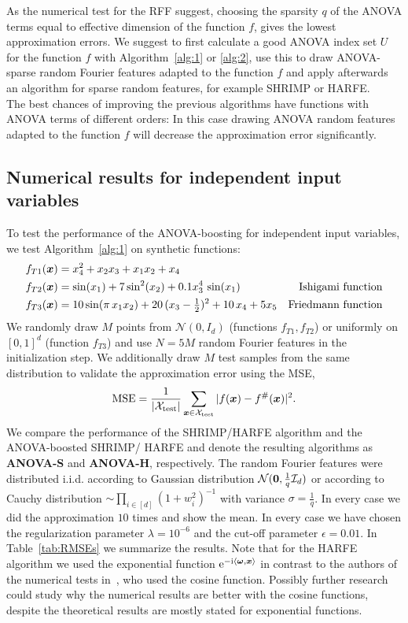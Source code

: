 \documentclass{article}
\renewcommand{\vec}[1]{\ensuremath \mathbf{\boldsymbol{#1}}}
\newcommand{\X}{\ensuremath{\mathcal{X}}}
\newcommand{\w}{\ensuremath{\vec \omega}}
\newcommand{\G}{\ensuremath{\mathcal{N}}} %
\newcommand{\x}{\ensuremath{\vec x}}
\newcommand{\I}{\ensuremath{\mathcal{I}}}
\newcommand{\e}{\mathrm{e}}
\newcommand{\im}{\mathrm{i}}
\theoremstyle{definition}
\numberwithin{equation}{section}
\begin{document}
As the numerical test for the RFF suggest, choosing the sparsity $q$ of the ANOVA terms equal to effective dimension of the function $f$, gives the lowest approximation errors. We suggest to first calculate a good ANOVA index set $U$ for the function $f$ with Algorithm~\ref{alg:1} or \ref{alg:2}, use this to draw ANOVA-sparse random Fourier features adapted to the function $f$ and apply afterwards an algorithm for sparse random features, for example SHRIMP or HARFE.\\
The best chances of 
improving the previous algorithms have functions with ANOVA terms of different orders: In this case drawing 
ANOVA random features adapted to the function $f$ will decrease the approximation error significantly. 

\subsection{Numerical results for independent input variables}
To test the performance of the ANOVA-boosting for independent input variables, we test Algorithm~\ref{alg:1} on synthetic functions:
\begin{align}\label{eq:fT1}
f_{T1}(\vec x) &= x_4^2 +x_2x_3 +x_1x_2 +x_4&\\
f_{T2}(\vec x) &= \sin(x_1) + 7 \sin^2(x_2) +0.1 x_3^4\, \sin(x_1) & \text{Ishigami function}\label{eq:fT2}\\
f_{T3}(\x) &= 10 \sin(\pi \, x_1 x_2) + 20 \, (x_3- \tfrac 12)^2 + 10 \, x_4 + 5 x_5&\text{Friedmann function}\label{eq:fT3}
\end{align}
We randomly draw $M$ points from $\G(0,I_d)$ (functions $f_{T1},f_{T2}$) or uniformly on $[0,1]^d$ (function $f_{T3}$) and 
use $N=5M$ random Fourier features in the initialization step. We additionally draw $M$ test samples from the same distribution 
to validate the approximation error using the MSE,
$$\text{MSE} = \frac{1}{|\X_{\text{test}}|} \sum_{\x \in \X_{\text{test}}} |f(\x) - f^\#(\x)|^2.$$
We compare the performance of the SHRIMP/HARFE algorithm and the ANOVA-boosted 
SHRIMP/ HARFE and denote the resulting algorithms as \textbf{ANOVA-S} and \textbf{ANOVA-H}, respectively. The random Fourier features were distributed i.i.d. according to Gaussian distribution $\G(\vec 0,\tfrac 1q \I_d)$ or 			
according to Cauchy distribution $\sim\prod_{i\in [d]}(1+w_i^2)^{-1}$ with variance $\sigma = \tfrac 1q$. In every case we did the approximation 
$10$ times and show the mean. In every case we have chosen the regularization parameter $\lambda = 10^{-6}$ and the cut-off parameter $\epsilon = 0.01$. 
In Table~\ref{tab:RMSEs} we summarize the results. Note that for the HARFE algorithm we used the exponential function $\e^{-\im \langle  \w,\x\rangle}$ in contrast to the authors of the numerical tests in~\cite{HARFE23}, who used the cosine function. Possibly further research could study why the numerical results are better with the cosine functions, despite the theoretical results are mostly stated for exponential functions.  \par
\end{document}
